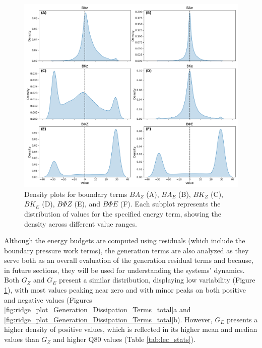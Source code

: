 \begin{figure}[!htbp]
\centering
\includegraphics[width=32pc]{figs_5/ridge_plot_Boundary_Terms_total.png}
\caption[Density Plots - Boundary Terms]{Density plots for boundary terms $BA_Z$ (A), $BA_E$ (B), $BK_Z$ (C), $BK_E$ (D), $B\Phi Z$ (E), and  $B\Phi E$ (F). Each subplot represents the distribution of values for the specified energy term, showing the density across different value ranges.}
\label{fig:ridge_plot_Boundary_Terms_total}
\end{figure}

Although the energy budgets are computed using residuals (which include the boundary pressure work terms), the generation terms are also analyzed as they serve both as an overall evaluation of the generation residual terms and because, in future sections, they will be used for understanding the systems' dynamics. Both $G_Z$ and $G_E$ present a similar distribution, displaying low variability (Figure \ref{fig:ridge_plot_Boundary_Terms_total}), with most values peaking near zero and with minor peaks on both positive and negative values (Figures \ref{fig:ridge_plot_Generation_Dissipation_Terms_total}a and \ref{fig:ridge_plot_Generation_Dissipation_Terms_total}b). However, $G_E$ presents a higher density of positive values, which is reflected in its higher mean and median values than $G_Z$ and higher Q80 values (Table \ref{tab:lec_stats}). 

